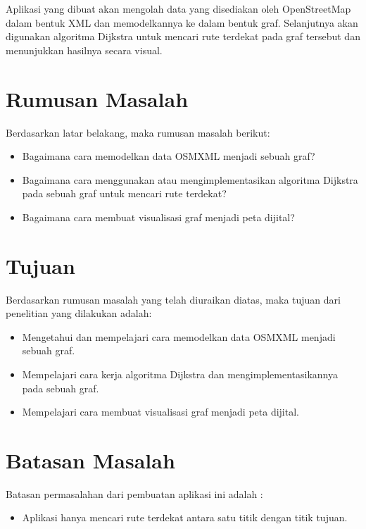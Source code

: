 Aplikasi yang dibuat akan mengolah data yang disediakan oleh OpenStreetMap dalam bentuk XML dan 
memodelkannya ke dalam bentuk graf. Selanjutnya akan digunakan algoritma Dijkstra untuk mencari 
rute terdekat pada graf tersebut dan menunjukkan hasilnya secara visual.

\section{Rumusan Masalah}
Berdasarkan latar belakang, maka rumusan masalah berikut: 
\begin{itemize}
	\item Bagaimana cara memodelkan data OSMXML menjadi sebuah graf?
	\item Bagaimana cara menggunakan atau mengimplementasikan algoritma Dijkstra
	pada sebuah graf untuk mencari rute terdekat?
	\item Bagaimana cara membuat visualisasi graf menjadi peta dijital?
\end{itemize}

\section{Tujuan}
Berdasarkan rumusan masalah yang telah diuraikan diatas, maka tujuan dari penelitian yang dilakukan
adalah:
\begin{itemize} 
	\item Mengetahui dan mempelajari cara memodelkan data OSMXML menjadi sebuah
	graf.
	\item Mempelajari cara kerja algoritma Dijkstra dan	mengimplementasikannya pada
	sebuah graf.
 	\item Mempelajari cara membuat visualisasi graf menjadi peta dijital. 
 \end{itemize}

\section{Batasan Masalah}
Batasan permasalahan dari pembuatan aplikasi ini adalah :
\begin{itemize}
	\item Aplikasi hanya mencari rute terdekat antara satu titik dengan titik
	tujuan.
\end{itemize}

